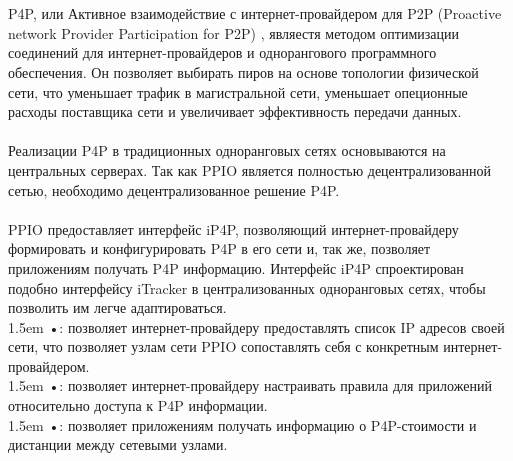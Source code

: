 \documentclass[10pt,a4paper]{article}
\newcommand\hl{\bgroup\markoverwith
  {\textcolor{lightgray}{\rule[-.5ex]{.1pt}{2.5ex}}}\ULon}
\begin{document}
 \vspace{-0.5em}
\\ \\ P4P, или Активное взаимодействие с интернет-провайдером для P2P (Proactive network Provider Participation for P2P) \cite{article17}, являестя методом оптимизации соединений для интернет-провайдеров и однорангового программного обеспечения. Он позволяет выбирать пиров на основе топологии физической сети, что уменьшает трафик в магистральной сети, уменьшает опеционные расходы поставщика сети и увеличивает эффективность передачи данных. 
  \vspace{-0.5em}
\\ \\Реализации P4P в традиционных одноранговых сетях основываются на центральных серверах. Так как PPIO является полностью децентрализованной сетью, необходимо децентрализованное решение P4P.
  \vspace{-0.5em}
\\ \\PPIO предоставляет интерфейс iP4P, позволяющий интернет-провайдеру формировать и конфигурировать P4P в его сети и, так же, позволяет приложениям получать P4P информацию. Интерфейс iP4P спроектирован подобно интерфейсу iTracker \cite{article17} в централизованных одноранговых сетях, чтобы позволить им легче адаптироваться.
    \vspace{-0.8em}
\\

\hangindent 1.5em
\noindent   
•: позволяет интернет-провайдеру предоставлять список IP адресов своей сети, что позволяет узлам сети PPIO сопоставлять себя с конкретным интернет-провайдером.
\vspace{-0.8em}                                                      %
\\

\hangindent 1.5em
\noindent   
•: позволяет интернет-провайдеру настраивать правила для приложений относительно доступа к P4P информации.
\vspace{-0.8em}
\\

\hangindent 1.5em
\noindent   
•: позволяет приложениям получать информацию о P4P-стоимости и дистанции между сетевыми узлами.
\vspace{-0.8em}
\\
\end{document}
